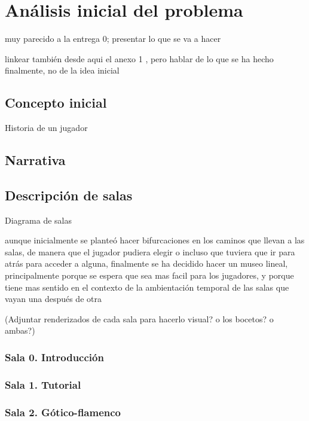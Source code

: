 \chapter{Análisis inicial del problema}
\label{chap:analisis_problema}

muy parecido a la entrega 0; presentar lo que se va a hacer

linkear también desde aqui el anexo 1 , pero hablar de lo que se ha hecho finalmente, no de la idea inicial

\section{Concepto inicial}

Historia de un jugador

\section{Narrativa}

\section{Descripción de salas}

Diagrama de salas

aunque inicialmente se planteó hacer bifurcaciones en los caminos que llevan a las salas, de manera que el jugador pudiera elegir o incluso que tuviera que ir para atrás para acceder a alguna, finalmente se ha decidido hacer un museo lineal, principalmente porque se espera que sea mas facil para los jugadores, y porque tiene mas sentido en el contexto de la ambientación temporal de las salas que vayan una después de otra

(Adjuntar renderizados de cada sala para hacerlo visual? o los bocetos? o ambas?)


\subsection{Sala 0. Introducción}

\subsection{Sala 1. Tutorial}

\subsection{Sala 2. Gótico-flamenco}

